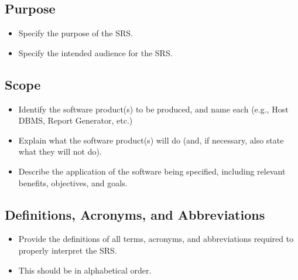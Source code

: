 \documentclass[]{article}
\begin{document}
\subsection{Purpose}
\label{sub:purpose}
\begin{itemize}
    \item Specify the purpose of the SRS.
    \item Specify the intended audience for the SRS.
\end{itemize}
\subsection{Scope}
\label{sub:scope}
\begin{itemize}
    \item Identify the software product(s) to be produced, and name each (e.g., Host DBMS, Report Generator, etc.)
    \item Explain what the software product(s) will do (and, if necessary, also state what they will not do).
    \item Describe the application of the software being specified, including relevant benefits, objectives, and goals.
\end{itemize}
\subsection{Definitions, Acronyms, and Abbreviations}
\label{sub:definitions_acronyms_and_abbreviations}
\begin{itemize}
    \item Provide the definitions of all terms, acronyms, and abbreviations required to properly interpret the SRS.
    \item This should be in alphabetical order.
\end{itemize}
\end{document}
